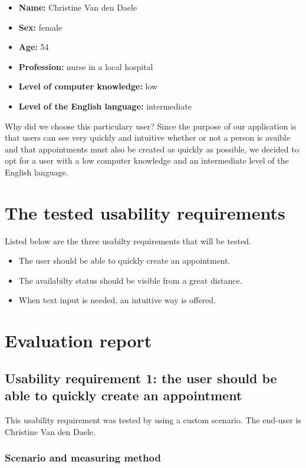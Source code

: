 \documentclass[11pt, a4paper,svglistings]{report}
\begin{document}
\begin{itemize}
\item \textbf{Name:} Christine Van den Daele
\item \textbf{Sex:} female
\item \textbf{Age:} 54
\item \textbf{Profession:} nurse in a local hospital
\item \textbf{Level of computer knowledge:} low
\item \textbf{Level of the English language:} intermediate
\end{itemize}

Why did we choose this particulary user? Since the purpose of our application is that users can see very quickly and intuitive whether or not a person is avaible and that appointments must also be created as quickly as possible, we decided to opt for a user with a low computer knowledge and an intermediate level of the English language. 

\section{The tested usability requirements}

Listed below are the three usabilty requirements that will be tested.

\begin{itemize}
\item The user should be able to quickly create an appointment.
\item The availabilty status should be visible from a great distance.
\item When text input is needed, an intuitive way is offered.
\end{itemize}

\section{Evaluation report}

\subsection{Usability requirement 1: the user should be able to quickly create an appointment}

This usability requirement was tested by using a custom scenario. The end-user is Christine Van den Daele.

\subsubsection{Scenario and measuring method}
\end{document}
